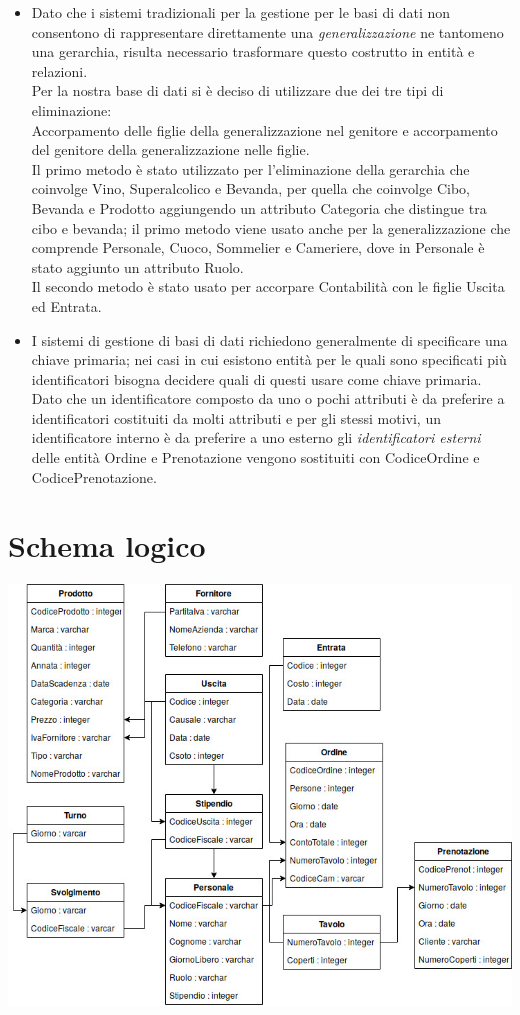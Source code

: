 \begin{itemize}
    \item Dato che i sistemi tradizionali per la gestione per le basi di dati non consentono di rappresentare direttamente una \textit{generalizzazione} ne tantomeno una gerarchia, risulta necessario trasformare questo costrutto in entità e relazioni. \\
    Per la nostra base di dati si è deciso di utilizzare due dei tre tipi di eliminazione:\\
    Accorpamento delle figlie della generalizzazione nel genitore e accorpamento del genitore della generalizzazione nelle figlie.\\ 
    Il primo metodo è stato utilizzato per l'eliminazione della gerarchia che coinvolge Vino, Superalcolico e Bevanda, per quella che coinvolge Cibo, Bevanda e Prodotto aggiungendo un attributo Categoria che distingue tra cibo e bevanda; il primo metodo viene usato anche per la generalizzazione che comprende Personale, Cuoco, Sommelier e Cameriere, dove in Personale è stato aggiunto un attributo Ruolo.\\
    Il secondo metodo è stato usato per accorpare Contabilità con le figlie Uscita ed Entrata.
    \item I sistemi di gestione di basi di dati richiedono generalmente di specificare una chiave primaria; nei casi in cui esistono entità per le quali sono specificati più identificatori bisogna decidere quali di questi usare come chiave primaria. \\
    Dato che un identificatore composto da uno o pochi attributi è da preferire a identificatori costituiti da molti attributi e per gli stessi motivi, un identificatore interno è da preferire a uno esterno gli \textit{identificatori esterni} delle entità Ordine e Prenotazione vengono sostituiti con CodiceOrdine e CodicePrenotazione.
\end{itemize}

\section{Schema logico}
\includegraphics[width=1\textwidth]{doc/schemaLogico}
